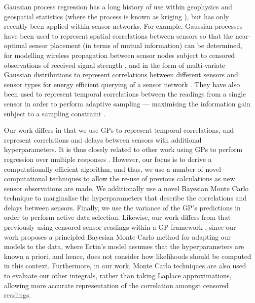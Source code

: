 \documentclass{acmsmall}
\begin{document}
\noindent Gaussian process regression has a long history of use within geophysics and geospatial statistics (where the process is known as kriging \cite{cressie}), but has only recently been applied within sensor networks. For example, Gaussian processes have been used to represent spatial correlations between sensors so that the near-optimal sensor placement (in terms of mutual information) can be determined, for modelling wireless propagation between sensor nodes subject to censored observations of received signal strength \cite{ertin2007gpm}, and in the form of multi-variate Gaussian distributions to represent correlations between different sensors and sensor types for energy efficient querying of a sensor network \cite{guestrin2}. They have also been used to represent temporal correlations between the readings from a single sensor in order to perform adaptive sampling --- maximising the information gain subject to a sampling constraint \cite{1525857}.

Our work differs in that we use GPs to represent temporal correlations, and represent correlations and delays between sensors with additional hyperparameters. It is thus closely related to other work using GPs to perform regression over multiple responses \cite{dep_GP,latent_factor}. However, our focus is to derive a computationally efficient algorithm, and thus, we use a number of novel computational techniques to allow the re-use of previous calculations as new sensor observations are made. We additionally use a novel Bayesian Monte Carlo technique to marginalise the hyperparameters that describe the correlations and delays between sensors. Finally, we use the variance of the GP's predictions in order to perform active data selection. Likewise, our work differs from that previously using censored sensor readings within a GP framework \cite{ertin2007gpm}, since our work proposes a principled Bayesian Monte Carlo method for adapting our models to the data, where Ertin's model assumes that the hyperparameters are known a priori, and hence, does not consider how likelihoods should be computed in this context. Furthermore, in our work, Monte Carlo techniques are also used to evaluate our other integrals, rather than taking Laplace approximations, allowing more accurate representation of the correlation amongst censored readings. 
\end{document}

